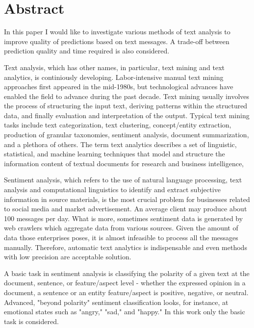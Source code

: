 \documentclass[12pt]{report}
\begin{document}
\renewcommand{\bibname}{References}
\setcounter{tocdepth}{1}

\setcounter{page}{2}

\large

\thispagestyle{empty}
\tableofcontents

\chapter*{Abstract}

In this paper I would like to investigate various methods of text analysis to improve quality of predictions based on text messages. A trade-off between prediction quality and time required is also considered.

Text analysis, which has other names, in particular, text mining and text analytics, is continiously developing. Labor-intensive manual text mining approaches first appeared in the mid-1980s, but technological advances have enabled the field to advance during the past decade. Text mining usually involves the process of structuring the input text, deriving patterns within the structured data, and finally evaluation and interpretation of the output. Typical text mining tasks include text categorization, text clustering, concept/entity extraction, production of granular taxonomies, sentiment analysis, document summarization, and a plethora of others.
The term text analytics describes a set of linguistic, statistical, and machine learning techniques that model and structure the information content of textual documents for research and business intelligence,

Sentiment analysis, which refers to the use of natural language processing, text analysis and computational linguistics to identify and extract subjective information in source materials, is the most crucial problem for businesses related to social media and market advertisement. An average client may produce about 100 messages per day. What is more, sometimes sentiment data is generated by web crawlers which aggregate data from various sources. Given the amount of data those enterprises poses, it is almost infeasible to process all the messages manually. Therefore, automatic text analytics is indispensable and even methods with low precision are acceptable solution.

A basic task in sentiment analysis is classifying the polarity of a given text at the document, sentence, or feature/aspect level - whether the expressed opinion in a document, a sentence or an entity feature/aspect is positive, negative, or neutral. Advanced, "beyond polarity" sentiment classification looks, for instance, at emotional states such as "angry," "sad," and "happy." In this work only the basic task is considered.
\end{document}
